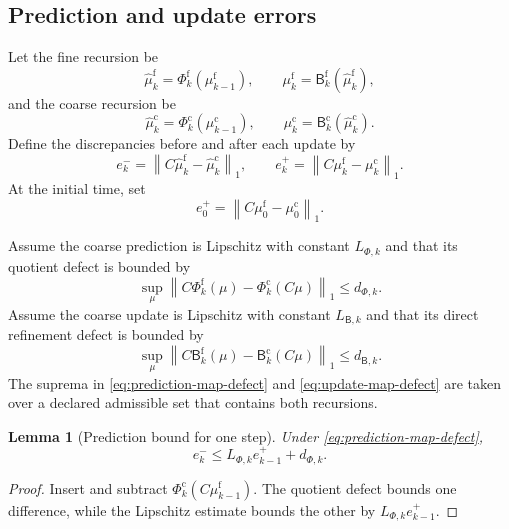 \documentclass[11pt]{article}
\newtheorem{lemma}[theorem]{Lemma}
\theoremstyle{definition}
\theoremstyle{remark}
\newcommand{\norm}[1]{\left\lVert #1\right\rVert}
\newcommand{\fine}{\mathrm f}
\newcommand{\coarse}{\mathrm c}
\newcommand{\Bup}{\mathsf B}
\begin{document}
\subsection{Prediction and update errors}
Let the fine recursion be
\begin{equation}\label{eq:fine-filter-recursion}
  \widehat\mu_k^{\fine}
  =\Phi_k^{\fine}(\mu_{k-1}^{\fine}),
  \qquad
  \mu_k^{\fine}
  =\Bup_k^{\fine}(\widehat\mu_k^{\fine}),
\end{equation}
and the coarse recursion be
\begin{equation}\label{eq:coarse-filter-recursion}
  \widehat\mu_k^{\coarse}
  =\Phi_k^{\coarse}(\mu_{k-1}^{\coarse}),
  \qquad
  \mu_k^{\coarse}
  =\Bup_k^{\coarse}(\widehat\mu_k^{\coarse}).
\end{equation}
Define the discrepancies before and after each update by
\begin{equation}\label{eq:pre-post-errors}
  e_k^-
  =\norm{C\widehat\mu_k^{\fine}-\widehat\mu_k^{\coarse}}_1,
  \qquad
  e_k^+
  =\norm{C\mu_k^{\fine}-\mu_k^{\coarse}}_1.
\end{equation}
At the initial time, set
\[
  e_0^+=\norm{C\mu_0^{\fine}-\mu_0^{\coarse}}_1.
\]

Assume the coarse prediction is Lipschitz with constant $L_{\Phi,k}$ and that its quotient defect is bounded by
\begin{equation}\label{eq:prediction-map-defect}
  \sup_{\mu}
  \norm{C\Phi_k^{\fine}(\mu)-\Phi_k^{\coarse}(C\mu)}_1
  \leq d_{\Phi,k}.
\end{equation}
Assume the coarse update is Lipschitz with constant $L_{\Bup,k}$ and that its direct refinement defect is bounded by
\begin{equation}\label{eq:update-map-defect}
  \sup_{\mu}
  \norm{C\Bup_k^{\fine}(\mu)-\Bup_k^{\coarse}(C\mu)}_1
  \leq d_{\Bup,k}.
\end{equation}
The suprema in \eqref{eq:prediction-map-defect} and \eqref{eq:update-map-defect} are taken over a declared admissible set that contains both recursions.

\begin{lemma}[Prediction bound for one step]\label{lem:prediction-step}
Under \eqref{eq:prediction-map-defect},
\begin{equation}\label{eq:prediction-step}
  e_k^-
  \leq
  L_{\Phi,k}e_{k-1}^+
  +d_{\Phi,k}.
\end{equation}
\end{lemma}

\begin{proof}
Insert and subtract $\Phi_k^{\coarse}(C\mu_{k-1}^{\fine})$.  The quotient defect bounds one difference, while the Lipschitz estimate bounds the other by $L_{\Phi,k}e_{k-1}^+$.
\end{proof}
\end{document}
